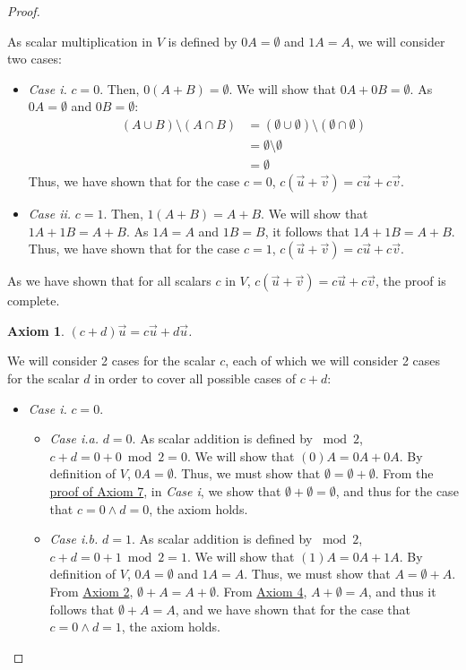 \documentclass[11pt]{scrartcl}
\theoremstyle{dotlessP}
\newtheorem{axiom}{Axiom}
\theoremstyle{dotlessN}
\newcommand{\unite}{\cup}
\newcommand{\inter}{\cap}
\begin{document}
\begin{proof}
\begin{subproof}
			[Subproof]
			As scalar multiplication in $V$ is defined by $0A = \emptyset$ and $1A = A$, we will consider two cases:
			\begin{itemize}
				\item \textit{Case i.} $c = 0$. Then, $0(A+B) = \emptyset$. We will show that  $0A + 0B = \emptyset$. As $0A = \emptyset$ and $0B = \emptyset$:
					\begin{align*}
						(A \unite B) \setminus (A \inter B) &= (\emptyset \unite \emptyset) \setminus (\emptyset \inter \emptyset) \\
															&= \emptyset \setminus \emptyset \\
															&= \emptyset
					\end{align*}
					Thus, we have shown that for the case $c=0$, $c(\vec{u} + \vec{v}) = c\vec{u} + c\vec{v}$.
				\item \textit{Case ii.} $c = 1$. Then, $1(A + B) = A + B$. We will show that  $1A + 1B = A + B$. As $1A = A$ and $1B = B$, it follows that $1A + 1B = A + B$. Thus, we have shown that for the case $c = 1$, $c(\vec{u} + \vec{v}) = c\vec{u} + c\vec{v}$.
			\end{itemize}
			As we have shown that for all scalars $c$ in $V$, $c(\vec{u} + \vec{v}) = c\vec{u} + c\vec{v}$, the proof is complete.
		\end{subproof}
		\begin{axiom}
			$(c + d)\vec{u} = c\vec{u} + d\vec{u}$.
		\end{axiom}
		\begin{subproof}
			[Subproof]
				We will consider 2 cases for the scalar $c$, each of which we will consider 2 cases for the scalar $d$ in order to cover all possible cases of $c + d$:
				\begin{itemize}
					\item \textit{Case i.} $c = 0$.
						\begin{itemize}
							\item \textit{Case i.a.} $d = 0$. As scalar addition is defined by $\bmod 2$,  $c + d = 0 + 0 \bmod 2 = 0$. We will show that  $(0)A = 0A + 0A$.  By definition of $V$, $0A = \emptyset$. Thus, we must show that $\emptyset = \emptyset + \emptyset$. From the \hyperref[axiom:7]{proof of Axiom 7}, in \textit{Case i}, we show that $\emptyset + \emptyset = \emptyset$, and thus for the case that  $c = 0 \land d = 0$, the axiom holds.
							\item \textit{Case i.b.} $d = 1$. As scalar addition is defined by $\bmod 2$, $c + d = 0 + 1 \bmod 2 = 1$. We will show that $(1)A = 0A + 1A$. By definition of $V$, $0A = \emptyset$ and $1A = A$. Thus, we must show that $A = \emptyset + A$. From \hyperref[axiom:2]{Axiom 2}, $\emptyset + A = A + \emptyset$. From \hyperref[axiom:4]{Axiom 4}, $A + \emptyset = A$, and thus it follows that $\emptyset + A = A$, and we have shown that for the case that $c = 0 \land d = 1$, the axiom holds.

\end{itemize}
\end{itemize}
\end{subproof}
\end{proof}
\end{document}
